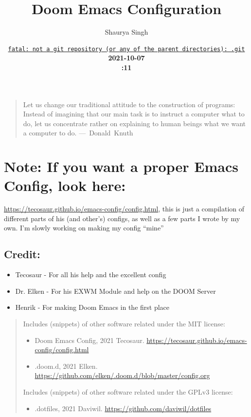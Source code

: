 \documentclass{scrartcl}
\author{Shaurya Singh}
\date{\href{https://github.com/shaunsingh/vimrc-dotfiles/commit/fatal: not a git repository (or any of the parent directories): .git}{\normalsize\texttt{fatal: not a git repository (or any of the parent directories): .git}}\\\Large\bfseries 2021-10-07 \\\normalsize\mdseries15:11 \acr{\lowercase{EDT}}}
\title{Doom Emacs Configuration}
\begin{document}
\maketitle
\tableofcontents

\begin{quote}
Let us change our traditional attitude to the construction of programs:
Instead of imagining that our main task is to instruct a computer what to do,
let us concentrate rather on explaining to human beings what we want a
computer to do. \mbox{--- Donald Knuth}
\end{quote}

\section{\textbf{Note:} If you want a proper Emacs Config, look here:}
\label{sec:org258e7b3}
\url{https://tecosaur.github.io/emacs-config/config.html}, this is just a compilation
of different parts of his (and other's) configs, as well as a few parts I wrote
by my own. I'm slowly working on making my config ``mine''

\subsection{Credit:}
\label{sec:orge1cb417}
\begin{itemize}
\item Tecosaur - For all his help and the excellent config
\item Dr. Elken - For his EXWM Module and help on the DOOM Server
\item Henrik - For making Doom Emacs in the first place
\end{itemize}

\begin{quote}
Includes (snippets) of other software related under the MIT license:
\begin{itemize}
\item Doom Emacs Config, 2021 Tecosaur. \url{https://tecosaur.github.io/emacs-config/config.html}
\item .doom.d, 2021 Elken. \url{https://github.com/elken/.doom.d/blob/master/config.org}
\end{itemize}

Includes (snippets) of other software related under the GPLv3 license:
\begin{itemize}
\item .dotfiles, 2021 Daviwil. \url{https://github.com/daviwil/dotfiles}
\end{itemize}
\end{quote}
\end{document}
